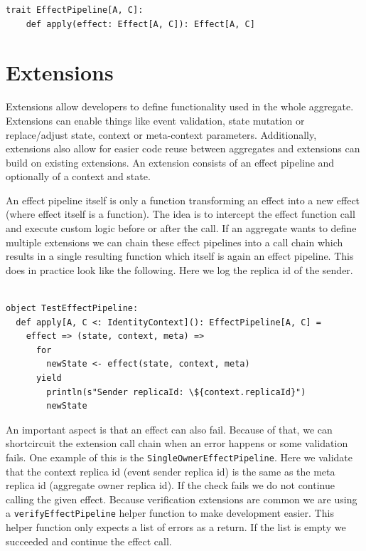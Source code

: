 \documentclass[
	english,
	ruledheaders=section,   %
	class=report,		    %
	thesis={type=bachelor}, %
	accentcolor=9c,			%
	custommargins=true,    %
	marginpar=false,        %
	parskip=half-,          %
	fontsize=11pt,          %
]{tudapub}
\begin{document}
\begin{lstlisting}
trait EffectPipeline[A, C]:
	def apply(effect: Effect[A, C]): Effect[A, C]
\end{lstlisting}

\section{Extensions}
Extensions allow developers to define functionality used in the whole aggregate. Extensions can enable things like event validation, state mutation or replace/adjust state, context or meta-context parameters. Additionally, extensions also allow for easier code reuse between aggregates and extensions can build on existing extensions. An extension consists of an effect pipeline and optionally of a context and state. 

An effect pipeline itself is only a function transforming an effect into a new effect (where effect itself is a function). The idea is to intercept the effect function call and execute custom logic before or after the call. If an aggregate wants to define multiple extensions we can chain these effect pipelines into a call chain which results in a single resulting function which itself is again an effect pipeline. This does in practice look like the following. Here we log the replica id of the sender.

\begin{lstlisting}

object TestEffectPipeline:
  def apply[A, C <: IdentityContext](): EffectPipeline[A, C] =
    effect => (state, context, meta) => 
      for
        newState <- effect(state, context, meta)
      yield
        println(s"Sender replicaId: \${context.replicaId}")
        newState

\end{lstlisting}

An important aspect is that an effect can also fail. Because of that, we can shortcircuit the extension call chain when an error happens or some validation fails. One example of this is the \texttt{SingleOwnerEffectPipeline}. Here we validate that the context replica id (event sender replica id) is the same as the meta replica id (aggregate owner replica id). If the check fails we do not continue calling the given effect. Because verification extensions are common we are using a \texttt{verifyEffectPipeline} helper function to make development easier. This helper function only expects a list of errors as a return. If the list is empty we succeeded and continue the effect call.
\end{document}
